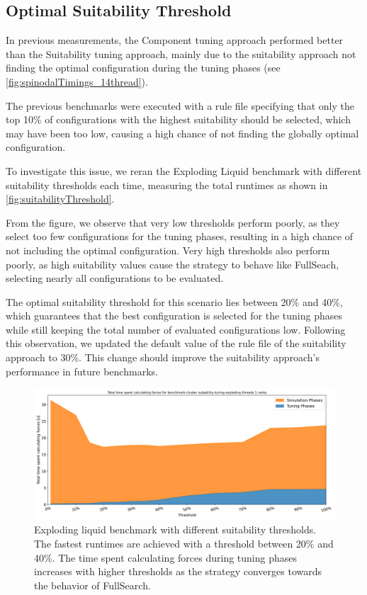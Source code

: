 \subsection{Optimal Suitability Threshold}
\label{sec:suitabilityThreshold}

In previous measurements, the Component tuning approach performed better than the Suitability tuning approach, mainly due to the suitability approach not finding the optimal configuration during the tuning phases (see \autoref{fig:spinodalTimings_14thread}).

The previous benchmarks were executed with a rule file specifying that only the top 10\% of configurations with the highest suitability should be selected, which may have been too low, causing a high chance of not finding the globally optimal configuration.

To investigate this issue, we reran the Exploding Liquid benchmark with different suitability thresholds each time, measuring the total runtimes as shown in \autoref{fig:suitabilityThreshold}.

From the figure, we observe that very low thresholds perform poorly, as they select too few configurations for the tuning phases, resulting in a high chance of not including the optimal configuration. Very high thresholds also perform poorly, as high suitability values cause the strategy to behave like FullSeach, selecting nearly all configurations to be evaluated.

The optimal suitability threshold for this scenario lies between 20\% and 40\%, which guarantees that the best configuration is selected for the tuning phases while still keeping the total number of evaluated configurations low. Following this observation, we updated the default value of the rule file of the suitability approach to 30\%. This change should improve the suitability approach's performance in future benchmarks.

\begin{figure}[H]
    \centering
    \includegraphics[width=\columnwidth,trim={0cm 0cm 0cm 0.9cm},clip]{figures/Benchmark/SuitabilitySearch/SuitabilityExploding_timings_threshold_benchmark-cluster_suitability-tuning-exploding_1.png}
    \caption[
        Impact of the suitability threshold on the simulation performance
    ]{Exploding liquid benchmark with different suitability thresholds. The fastest runtimes are achieved with a threshold between 20\% and 40\%. The time spent calculating forces during tuning phases increases with higher thresholds as the strategy converges towards the behavior of FullSearch.}
    \label{fig:suitabilityThreshold}
\end{figure}

